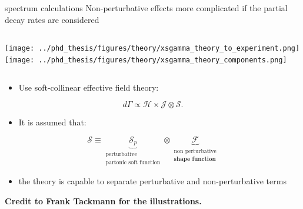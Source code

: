 \documentclass[xcolor=dvipsnames]{beamer}
\begin{document}
\begin{frame}{\safeBtoXsdgamma spectrum calculations}
   \scriptsize
      Non-perturbative effects more complicated if the partial decay rates are considered
   
      \begin{columns}
         \texttt{[image: ../phd\_thesis/figures/theory/xsgamma\_theory\_to\_experiment.png]}
         \texttt{[image: ../phd\_thesis/figures/theory/xsgamma\_theory\_components.png]}
      \end{columns}
   
      \begin{itemize}
         \item Use soft-collinear effective field theory:
      \end{itemize}
      \begin{equation}\nonumber
         d\Gamma \propto \mathcal{H} \times \mathcal{J} \otimes \mathcal{S}.
     \end{equation}

     \vspace{-10pt}
     \begin{itemize}
      \item It is assumed that:
     \end{itemize}
     \begin{equation}\nonumber
      \mathcal{S} \equiv \underbrace{\mathcal{S}_p}_{\substack{\text{perturbative}\\\text{partonic soft function}}} \otimes \underbrace{\mathcal{F}}_{\substack{\text{non perturbative}\\\textbf{shape function}}}
     \end{equation}
     \begin{itemize}
      \item[\ra] the theory is capable to separate perturbative and non-perturbative terms 
     \end{itemize}

   \vspace{-5pt}
   
   \begin{flushright}
      \tiny \textbf{Credit to Frank Tackmann for the illustrations.}
   \end{flushright}
   
   \end{frame}
\end{document}

